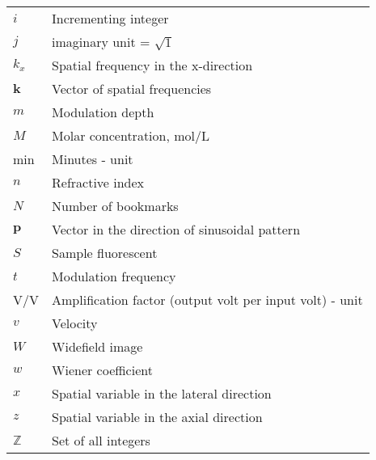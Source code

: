 \begin{flushleft}
\begin{longtable}[l]{|R{5.5em}|p{25em}|}
$i$               & Incrementing integer                              \\
$j$               & imaginary unit = $\sqrt{1}$                       \\
$k_x$             & Spatial frequency in the x-direction              \\
$\mathbf{k}$      & Vector of spatial frequencies                                 \\
$m$               & Modulation depth                                  \\
$M$               & Molar concentration, mol/L                        \\
min		          & Minutes - unit                                            \\
$n$               & Refractive index                                  \\
$N$               & Number of bookmarks                               \\
$\mathbf{p}$      & Vector in the direction of sinusoidal pattern    \\
$S$               & Sample fluorescent                                \\
$t$               & Modulation frequency                              \\
V/V 		      & Amplification factor (output volt per input volt) - unit \\
$v$               & Velocity                                          \\
$W$               & Widefield image                                   \\
$w$               & Wiener coefficient                                \\
$x$               & Spatial variable in the lateral direction         \\
$z$               & Spatial variable in the axial direction           \\
$\mathbb{Z}$      & Set of all integers                                           \\
\hline
\end{longtable}
\end{flushleft}
